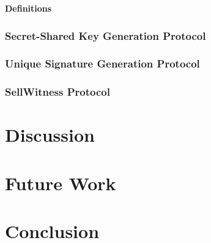 \documentclass[12pt]{article}
\begin{document}
\textbf{Definitions\\}



\subsubsection{Secret-Shared Key Generation Protocol}

\subsubsection{Unique Signature Generation Protocol}

\subsubsection{SellWitness Protocol}

\section{Discussion}

\section{Future Work}

\section{Conclusion}



\newpage


\end{document}
